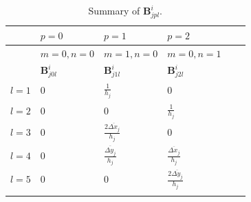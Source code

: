 \documentclass[review]{elsarticle}
\begin{document}
	\begin{table}[!htp]
		\centering
		\caption{\label{tab:Bijpl} Summary of $\bm{B}^i_{jpl}$.}
		\begin{threeparttable}
			\begin{tabular}{p{100pt} p{100pt}<{\centering} p{80pt}<{\centering} p{80pt}<{\centering} p{80pt}<{\centering} p{80pt}<{\centering}}
				\hline
				\hline
				& $p=0$ & $p=1$ & $p=2$ \\
				\hline
				& $m=0, n=0$ & $m=1, n=0$ & $m=0, n=1$ \\
				\hline
				& $\bm{B}^i_{j0l}$ & $\bm{B}^i_{j1l}$ & $\bm{B}^i_{j2l}$ \\
				\hline
				$l=1$ & $0$ & $\frac{1}{h_j}$ & $0$ \\
				
				$l=2$ & $0$ & $0$ & $\frac{1}{h_j}$\\
				
				$l=3$ & $0$ & $\frac{2\overline{\Delta x_j}}{h_j}$ & $0$\\
				
				$l=4$ & $0$ & $\frac{\overline{\Delta y_j}}{h_j}$ & $\frac{\overline{\Delta x_j}}{h_j}$\\
				
				$l=5$ & $0$ & $0$ & $\frac{2\overline{\Delta y_j}}{h_j}$\\
				\lasthline
			\end{tabular}
		\end{threeparttable}
	\end{table}
\end{document}
